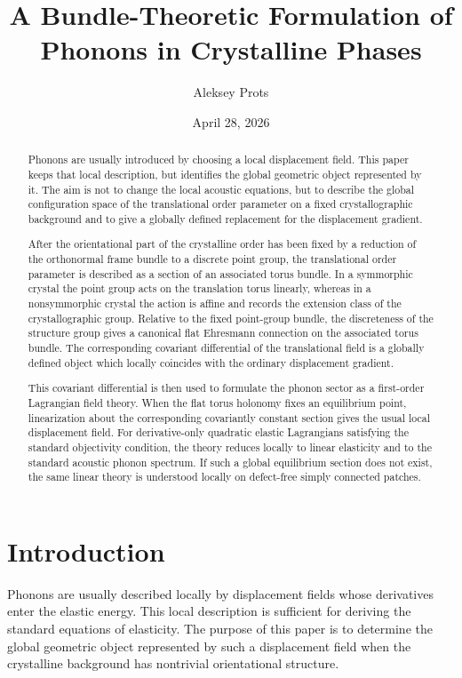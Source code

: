 \documentclass[11pt]{amsart}
\title[Bundle-Theoretic Formulation of Phonons]{A Bundle-Theoretic Formulation of Phonons in Crystalline Phases}
\author{Aleksey Prots}
\date{April 28, 2026}
\theoremstyle{plain}
\theoremstyle{definition}
\theoremstyle{remark}
\begin{document}
\begin{abstract}
	Phonons are usually introduced by choosing a local displacement field. 
	This paper keeps that local description, but identifies the global geometric 
	object represented by it. The aim is not to change the local acoustic 
	equations, but to describe the global configuration space of the translational 
	order parameter on a fixed crystallographic background and to give a globally 
	defined replacement for the displacement gradient.
	
	After the orientational part of the crystalline order has been fixed by a 
	reduction of the orthonormal frame bundle to a discrete point group, the 
	translational order parameter is described as a section of an associated 
	torus bundle. In a symmorphic crystal the point group acts on the translation 
	torus linearly, whereas in a nonsymmorphic crystal the action is affine and 
	records the extension class of the crystallographic group. Relative to the 
	fixed point-group bundle, the discreteness of the structure group gives a 
	canonical flat Ehresmann connection on the associated torus bundle. The 
	corresponding covariant differential of the translational field is a globally 
	defined object which locally coincides with the ordinary displacement gradient.
	
	This covariant differential is then used to formulate the phonon sector as a 
	first-order Lagrangian field theory. When the flat torus holonomy fixes an 
	equilibrium point, linearization about the corresponding covariantly constant 
	section gives the usual local displacement field. For derivative-only quadratic 
	elastic Lagrangians satisfying the standard objectivity condition, the theory 
	reduces locally to linear elasticity and to the standard acoustic phonon 
	spectrum. If such a global equilibrium section does not exist, the same 
	linear theory is understood locally on defect-free simply connected patches.
\end{abstract}



\maketitle

\section{Introduction}

Phonons are usually described locally by displacement fields whose derivatives enter the elastic energy. 
This local description is sufficient for deriving the standard equations of elasticity. 
The purpose of this paper is to determine the global geometric object represented by such a displacement field when the crystalline background has nontrivial orientational structure.
\end{document}
